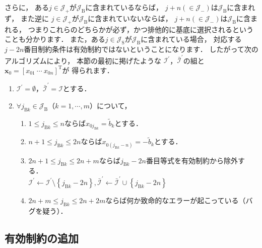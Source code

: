 ﻿\documentclass{jsarticle}
\begin{document}
さらに，
ある$j\in\mathcal{J}_{+}$が$\mathcal{J}_{\mathrm{B}}$に含まれているならば，
$j+n(\in\mathcal{J}_{-})$は$\mathcal{J}_{\mathrm{B}}$に含まれず，
また逆に
$j\in\mathcal{J}_{+}$が$\mathcal{J}_{\mathrm{B}}$に含まれていないならば，
$j+n(\in\mathcal{J}_{-})$は$\mathcal{J}_{\mathrm{B}}$に含まれる，
つまりこれらのどちらかが必ず，かつ排他的に基底に選択されるということも分かります．
また，ある$j\in\mathcal{J}_{\mathrm{S}}$が$\mathcal{J}_{\mathrm{B}}$に含まれている場合，
対応する$j-2n$番目制約条件は有効制約ではないということになります．
したがって次のアルゴリズムにより，
本節の最初に掲げたような
$\mathcal{I}^{\prime}$，$\bar{\mathcal{I}}^{\prime}$の組と
$\boldsymbol{x}_{0}=\left[x_{01}~\cdots~x_{0n}\right]^{\mathrm{T}}$が
得られます．
\begin{screen}
\begin{enumerate}
\item $\mathcal{I}^{\prime}=\emptyset$，$\bar{\mathcal{I}}^{\prime}=\mathcal{I}$とする．
\item $\forall j_{\mathrm{B}k}\in\mathcal{J}_{\mathrm{B}}$（$k=1,\cdots,m$）について，
  \begin{enumerate}
  \item $   1\leq j_{\mathrm{B}k}\leq  n   $ならば$x_{0j_{\mathrm{B}k}}=\tilde{b}_{k}$とする．
  \item $ n+1\leq j_{\mathrm{B}k}\leq 2n   $ならば$x_{0(j_{\mathrm{B}k}-n)}=-\tilde{b}_{k}$とする．
  \item $2n+1\leq j_{\mathrm{B}k}\leq 2n+ m$ならば$j_{\mathrm{B}k}-2n$番目等式を有効制約から除外する．
\\
$\mathcal{I}^{\prime}\leftarrow\mathcal{I}^{\prime}\setminus\left\{j_{\mathrm{B}k}-2n\right\},
\bar{\mathcal{I}}^{\prime}\leftarrow\bar{\mathcal{I}}^{\prime}\cup\left\{j_{\mathrm{B}k}-2n\right\}$
  \item $2n+m\leq j_{\mathrm{B}k}\leq 2n+2m$ならば何か致命的なエラーが起こっている（バグを疑う）．
  \end{enumerate}
\end{enumerate}
\end{screen}



\subsection{有効制約の追加}
\end{document}
